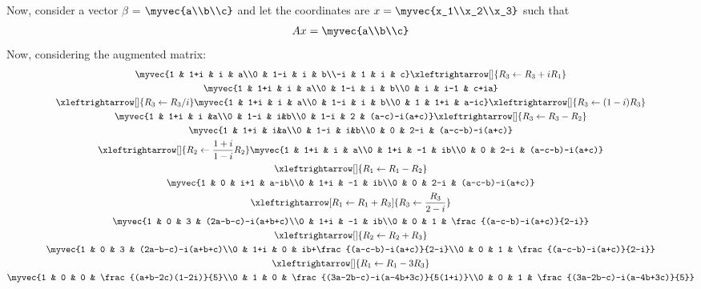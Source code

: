 \documentclass[journal,12pt,twocolumn]{IEEEtran}
\begin{document}
Now, consider a vector $\beta$ = $\myvec{a\\b\\c}$ and let the coordinates are $x=\myvec{x_1\\x_2\\x_3}$ such that
\begin{align}
Ax = \myvec{a\\b\\c}
\end{align}
Now, considering the augmented matrix:
\begin{multline}
\myvec{1 & 1+i & i & a\\0 & 1-i & i & b\\-i & 1 & i & c}\xleftrightarrow[]{R_3\leftarrow R_3+iR_1}\\
\myvec{1 & 1+i & i & a\\0 & 1-i & i & b\\0 & i & i-1 & c+ia}\\
\xleftrightarrow[]{R_3\leftarrow R_3/i}\myvec{1 & 1+i & i & a\\0 & 1-i & i & b\\0 & 1 & 1+i & a-ic}\xleftrightarrow[]{R_3\leftarrow (1-i)R_3}\\
\myvec{1 & 1+i & i &a\\0 & 1-i & i&b\\0 & 1-i & 2 & (a-c)-i(a+c)}\xleftrightarrow[]{R_3\leftarrow R_3-R_2}\\
\myvec{1 & 1+i & i&a\\0 & 1-i & i&b\\0 & 0 & 2-i & (a-c-b)-i(a+c)}\\
\xleftrightarrow[]{R_2\leftarrow \frac{1+i}{1-i}R_2}\myvec{1 & 1+i & i & a\\0 & 1+i & -1 & ib\\0 & 0 & 2-i & (a-c-b)-i(a+c)}\\
\xleftrightarrow[]{R_1\leftarrow R_1-R_2}\\
\myvec{1 & 0 & i+1 & a-ib\\0 & 1+i & -1 & ib\\0 & 0 & 2-i & (a-c-b)-i(a+c)}\\
\xleftrightarrow[R_1\leftarrow R_1+R_3]{R_3\leftarrow\frac{R_3}{2-i}}\\
\myvec{1 & 0 & 3 & (2a-b-c)-i(a+b+c)\\0 & 1+i & -1 & ib\\0 & 0 & 1 & \frac{(a-c-b)-i(a+c)}{2-i}}\\
\xleftrightarrow[]{R_2\leftarrow R_2+R_3}\\
\myvec{1 & 0 & 3 & (2a-b-c)-i(a+b+c)\\0 & 1+i & 0 & ib+\frac{(a-c-b)-i(a+c)}{2-i}\\0 & 0 & 1 & \frac{(a-c-b)-i(a+c)}{2-i}}\\
\xleftrightarrow[]{R_1\leftarrow R_1-3R_3}\\
\myvec{1 & 0 & 0 & \frac{(a+b-2c)(1-2i)}{5}\\0 & 1 & 0 & \frac{(3a-2b-c)-i(a-4b+3c)}{5(1+i)}\\0 & 0 & 1 & \frac{(3a-2b-c)-i(a-4b+3c)}{5}}
\end{multline}
\end{document}
